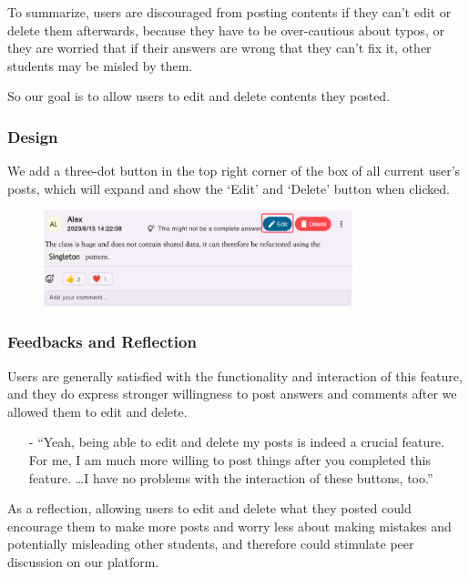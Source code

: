 \documentclass[a4paper]{article}
\begin{document}
    To summarize, users are discouraged from posting contents if they can’t edit or delete them afterwards,
    because they have to be over-cautious about typos, or they are worried that if their answers are wrong that they can't fix it,
    other students may be misled by them.

    So our goal is to allow users to edit and delete contents they posted.

    \subsubsection*{Design}

    We add a three-dot button in the top right corner of the box of all current user's posts,
    which will expand and show the `Edit' and `Delete' button when clicked.

    \begin{figure}[H]
        \centering
        \includegraphics[width=0.8\textwidth]{edit}
    \end{figure}

    \subsubsection*{Feedbacks and Reflection}

    Users are generally satisfied with the functionality and interaction of this feature,
    and they do express stronger willingness to post answers and comments after we allowed them to edit and delete.

    \begin{itemize}
        \item[-] ``Yeah, being able to edit and delete my posts is indeed a crucial feature.
                   For me, I am much more willing to post things after you completed this feature.
                   \ldots I have no problems with the interaction of these buttons, too.''
    \end{itemize}

    As a reflection, allowing users to edit and delete what they posted could encourage them to make more posts and worry less
    about making mistakes and potentially misleading other students, and therefore could stimulate peer discussion on our platform.
\end{document}
